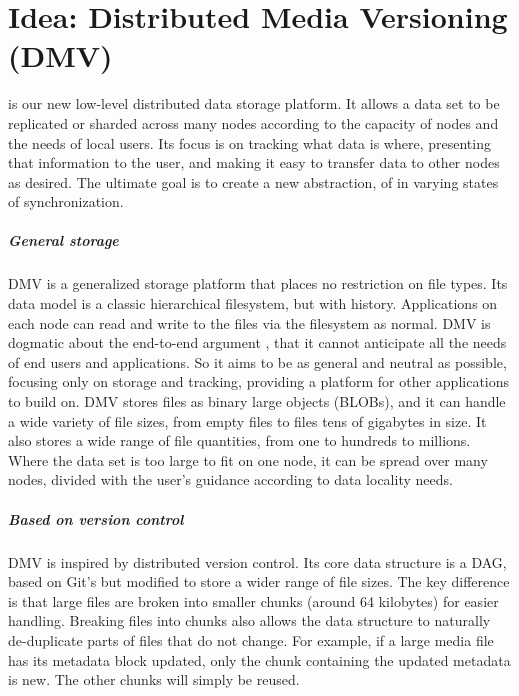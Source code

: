 \chapter{Idea: Distributed Media Versioning (DMV)}

 is our new low-level distributed
data storage platform. It allows a data set to be replicated or sharded across
many nodes according to the capacity of nodes and the needs of local users. Its
focus is on tracking what data is where, presenting that information to the
user, and making it easy to transfer data to other nodes as desired. The
ultimate goal is to create a new abstraction, of  in varying states of synchronization.


\paragraph{General storage}
DMV is a generalized storage platform that places no restriction on file types.
Its data model is a classic hierarchical filesystem, but with history.
Applications on each node can read and write to the files via the filesystem as
normal. DMV is dogmatic about the end-to-end argument \cite{endtoendargument},
that it cannot anticipate all the needs of end users and applications. So it
aims to be as general and neutral as possible, focusing only on storage and
tracking, providing a platform for other applications to build on. DMV stores
files as binary large objects (BLOBs), and it can handle a wide variety of file
sizes, from empty files to files tens of gigabytes in size. It also stores a
wide range of file quantities, from one to hundreds to millions. Where the data
set is too large to fit on one node, it can be spread over many nodes, divided
with the user's guidance according to data locality needs.

\paragraph{Based on version control}
DMV is inspired by distributed version control. Its core data structure is a
DAG, based on Git's but modified to store a wider range of file sizes. The key
difference is that large files are broken into smaller chunks (around 64
kilobytes) for easier handling. Breaking files into chunks also allows the data
structure to naturally de-duplicate parts of files that do not change. For
example, if a large media file has its metadata block updated, only the chunk
containing the updated metadata is new. The other chunks will simply be reused.

